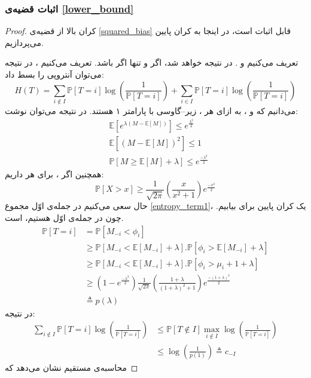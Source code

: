 \documentclass[a4paper,12pt]{article}
\newcommand{\E}{\mathbb{E}}
\newcommand{\Prob}{\mathbb{P}}
\begin{document}
	\subsubsection{اثبات قضیه‌ی
		\eqref{lower_bound}}
	\begin{proof}
		کران بالا از قضیه‌ی
		\eqref{squared_bias}
		قابل اثبات است، در اینجا به کران پایین می‌پردازیم.
		
		تعریف می‌کنیم
		و
		.
		در نتیجه
		خواهد شد، اگر و تنها اگر
		باشد. تعریف می‌کنیم
		\lr{$I=\{i:\E[M_{-i}]\geq\mu_i+1\}$}،
		در نتیجه می‌توان آنتروپی را بسط داد:
		\begin{equation}\label{entropy_term1}
		H(T) = \sum_{i\notin I} \Prob[T=i]\log\left(\frac{1}{\Prob[T=i]}\right) +  \sum_{i\in I} \Prob[T=i]\log\left(\frac{1}{\Prob[T=i]}\right)
		\end{equation}
		می‌دانیم که
		و
		،
		به ازای هر
		،
		زیر--گاوسی با پارامتر ۱ هستند. در نتیجه می‌توان نوشت:
		\begin{align}
		&\E[e^{\lambda(M-\E[M])}]\leq e^{\frac{\lambda^2}{2}}\\
		&\E\left[(M-\E[M])^2\right]\leq 1\\
		&\Prob[M\geq\E[M]+\lambda]\leq e^{\frac{-\lambda^2}{2}}
		\end{align}
		همچنین اگر
		،
		برای هر
		داریم:
		\begin{equation}
		\Prob[X>x]\geq \frac{1}{\sqrt{2\pi}} \left(\frac{x}{x^2+1}\right)e^{\frac{-x^2}{2}}
		\end{equation}
		حال سعی می‌کنیم در جمله‌ی اوّل مجموع
		\eqref{entropy_term1}،
		یک کران پایین برای
		\lr{$\Prob[T=i]$}
		بیابیم. چون در جمله‌ی اوّل هستیم،
		\lr{$\E[M_{-i}]<\mu_i+1$}
		است.
		\begin{align}
		\Prob[T=i] &= \Prob[M_{-i}<\phi_i]\\
		&\geq \Prob[M_{-i}<\E[M_{-i}]+\lambda].\Prob[\phi_i>\E[M_{-i}]+\lambda]\\
		&\geq \Prob[M_{-i}<\E[M_{-i}]+\lambda].\Prob[\phi_i>\mu_i+1+\lambda]\\
		&\geq \left(1-e^{\frac{-\lambda^2}{2}}\right)\frac{1}{\sqrt{2\pi}} \left(\frac{1+\lambda}{(1+\lambda)^2+1}\right)e^{\frac{-(1+\lambda)^2}{2}}\\
		&\triangleq p(\lambda)
		\end{align}
		در نتیجه:
		\begin{align}
		\sum_{i\notin I} \Prob[T=i]\log\left(\frac{1}{\Prob[T=i]}\right) &\leq \Prob[T\notin I]\max_{i \notin I}\log\left(\frac{1}{\Prob[T=i]}\right)\\
		&\leq \log\left(\frac{1}{p(1)}\right) \triangleq c_{-I}
		\end{align}
		محاسبه‌ی مستقیم نشان می‌دهد که
		

\end{proof}
\end{document}
